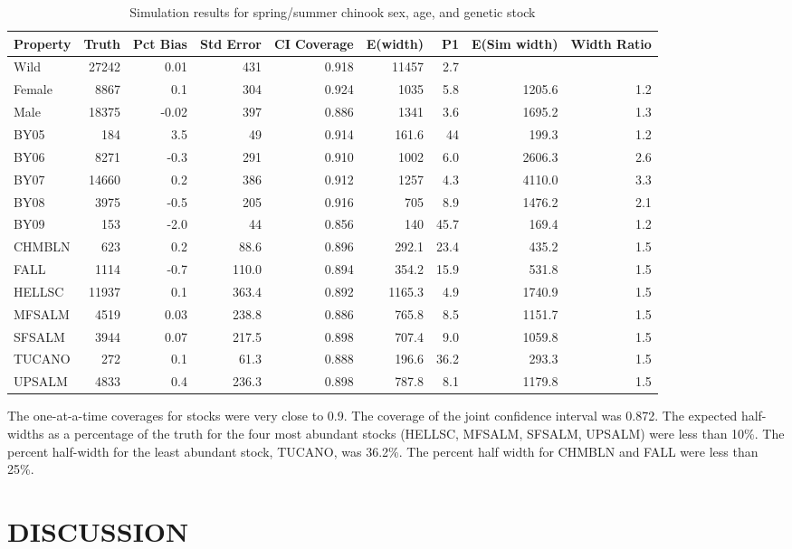 \documentclass[12pt]{article}
\begin{document}
\begin{table} %
\caption{Simulation results for spring/summer chinook sex, age, and genetic stock}
\label{table:CHsimresults}
\footnotesize
\begin{tabular}{ | l | r | r | r | r | r | r | r | r | }
\hline
Property&Truth&Pct Bias&Std Error&CI Coverage&E(width)&P1&E(Sim width)&Width Ratio \\ \hline
Wild&27242&0.01&431&0.918&11457&2.7&& \\ \hline
Female&8867&0.1&304&0.924&1035&5.8&1205.6&1.2 \\ \hline
Male&18375&-0.02&397&0.886&1341&3.6&1695.2&1.3 \\ \hline
BY05&184&3.5&49&0.914&161.6&44&199.3&1.2 \\ \hline
BY06&8271&-0.3&291&0.910&1002&6.0&2606.3&2.6 \\ \hline
BY07&14660&0.2&386&0.912&1257&4.3&4110.0&3.3 \\ \hline
BY08&3975&-0.5&205&0.916&705&8.9&1476.2&2.1 \\ \hline
BY09&153&-2.0&44&0.856&140&45.7&169.4&1.2 \\ \hline
CHMBLN&623&0.2&88.6&0.896&292.1&23.4&435.2&1.5 \\ \hline
FALL&1114&-0.7&110.0&0.894&354.2&15.9&531.8&1.5 \\ \hline
HELLSC&11937&0.1&363.4&0.892&1165.3&4.9&1740.9&1.5 \\ \hline
MFSALM&4519&0.03&238.8&0.886&765.8&8.5&1151.7&1.5 \\ \hline
SFSALM&3944&0.07&217.5&0.898&707.4&9.0&1059.8&1.5 \\ \hline
TUCANO&272&0.1&61.3&0.888&196.6&36.2&293.3&1.5 \\ \hline
UPSALM&4833&0.4&236.3&0.898&787.8&8.1&1179.8&1.5 \\ \hline
\end{tabular}
\end{table}

The one-at-a-time coverages for stocks were very close to 0.9. The coverage of the joint confidence interval was 0.872. The expected half-widths as a percentage of the truth for the four most abundant stocks (HELLSC, MFSALM, SFSALM, UPSALM) were less than 10\%. The percent half-width for the least abundant stock, TUCANO, was 36.2\%. The percent half width for CHMBLN and FALL were less than 25\%.

\section{DISCUSSION}	
\end{document}
